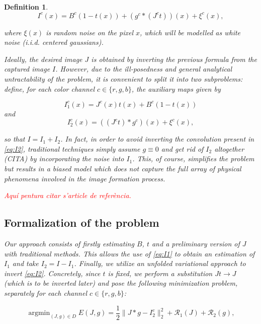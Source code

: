 \documentclass[twocolumn,twoside,a4paper,10pt]{IEEEtran}
\newtheorem{definition}{Definition}
\newcommand{\Frank}[1]{\textcolor{red}{#1}}
\DeclareMathOperator*{\argmin}{\operatorname*{argmin}}
\begin{document}
\begin{definition}
\begin{equation}\label{eq:physical-model}
  I^c(x) = B^c\left(1 - t(x)\right) + \left(g^c\ast\left(J^c t\right)\right) (x) + \xi^c(x),
\end{equation}

where \(\xi(x)\) is random noise on the pixel \(x\), which will be modelled as white noise (i.i.d. centered gaussians).

Ideally, the desired image \(J\) is obtained by inverting the previous formula from the captured image \(I\). However, due to the ill-posedness and general analytical untractability of the problem, it is convenient to split it into two subproblems: define, for each color channel \(c\in\{r, g, b\}\), the auxiliary maps given by

\begin{equation}\label{eq:I1}
  I_1^c(x)=J^c(x)t(x) + B^c(1-t(x))
\end{equation}
and 
\begin{equation}\label{eq:I2}
  I_2^c(x) = \left(\left(J^ct\right)\ast g^c\right)(x) + \xi^c(x),
\end{equation}

so that \(I = I_1 + I_2\). In fact, in order to avoid inverting the convolution present in \cref{eq:I2}, traditional techniques simply assume \(g\equiv 0\) and get rid of \(I_2\) altogether (CITA) by incorporating the noise into \(I_1\). This, of course, simplifies the problem but results in a biased model which does not capture the full array of physical phenomena involved in the image formation process.

\Frank{Aquí pentura citar s'article de referència.}

\subsection{Formalization of the problem}
Our approach consists of firstly estimating \(B\), \(t\) and a preliminary version of \(J\) with traditional methods. This allows the use of \cref{eq:I1} to obtain an estimation of \(I_1\) and take \(I_2 = I - I_1\). Finally, we utilize an unfolded variational approach to invert \cref{eq:I2}. Concretely, since \(t\) is fixed, we perform a substitution \(Jt\to J\) (which is to be inverted later) and pose the following minimization problem, separately for each channel \(c\in\{r, g, b\}\):

\begin{equation}\label{eq:full-I2-functional}
  \argmin_{(J, g)\in D} E(J, g) = \frac12\|J\ast g - I_2^c\|_2^2 + \mathcal{R}_1(J) + \mathcal{R}_2(g),
\end{equation}


\end{definition}
\end{document}
